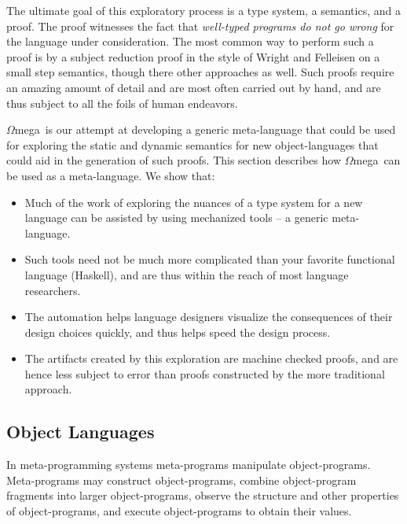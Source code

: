 \documentclass[11pt,twoside,A4]{llncs}
\newcommand{\om}{\emph{$\Omega$}mega}
\begin{document}
The ultimate goal of this exploratory process is a type system, a semantics,
and a proof. The proof witnesses the fact that {\em well-typed programs do not
go wrong}\cite{Milner78} for the language under consideration. The most common
way to perform such a proof is by a subject reduction proof in the style of
Wright and Felleisen\cite{Wright:94} on a small step semantics, though there
other approaches as well\cite{Milner78,DamasThesis}. Such proofs require an amazing amount of
detail and are most often carried out by hand, and are thus subject to all the
foils of human endeavors. 

\om\ is our attempt at developing a generic meta-language that could be used
for exploring the static and dynamic semantics for new
object-languages\cite{SheardPasalic2002,Sheard01} that
could aid in the generation of such proofs. This section describes how 
\om\ can be used as a meta-language. We show that:


\begin{itemize}

\item Much of the work of exploring the nuances of
a type system for a new language can be assisted by using mechanized tools 
-- a generic meta-language.

\item Such tools need not be much more complicated than your favorite
functional language (Haskell), and are thus within the reach of most language researchers.

\item The automation helps language designers visualize the consequences
of their design choices quickly, and thus helps speed the design process.

\item The artifacts created by this exploration are machine checked proofs,
and are hence less subject to error than proofs constructed by the more
traditional approach.

\end{itemize}

\subsection{Object Languages}

In meta-programming systems meta-programs manipulate object-programs. 
Meta-programs may construct object-programs, combine object-program 
fragments into larger object-programs, observe the structure and 
other properties of object-programs, and execute object-programs to 
obtain their values.
\end{document}
